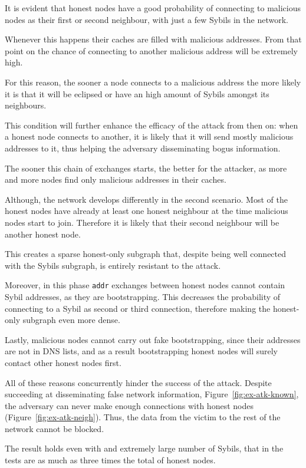 It is evident that honest nodes have a good probability of connecting to malicious nodes as their first or second neighbour, with just a few Sybils in the network.

Whenever this happens their caches are filled with malicious addresses. From that point on the chance of connecting to another malicious address will be extremely high.

For this reason, the sooner a node connects to a malicious address the more likely it is that it will be eclipsed or have an high amount of Sybils amongst its neighbours.

This condition will further enhance the efficacy of the attack from then on: when a honest node connects to another, it is likely that it will send mostly malicious addresses to it, thus helping the adversary disseminating bogus information.

The sooner this chain of exchanges starts, the better for the attacker, as more and more nodes find only malicious addresses in their caches.

Although, the network develops differently in the second scenario. Most of the honest nodes have already at least one honest neighbour at the time malicious nodes start to join. Therefore it is likely that their second neighbour will be another honest node.

This creates a sparse honest-only subgraph that, despite being well connected with the Sybils subgraph, is entirely resistant to the attack.

Moreover, in this phase \texttt{addr} exchanges between honest nodes cannot contain Sybil addresses, as they are bootstrapping. This decreases the probability of connecting to a Sybil as second or third connection, therefore making the honest-only subgraph even more dense.

Lastly, malicious nodes cannot carry out fake bootstrapping, since their addresses are not in DNS lists, and as a result bootstrapping honest nodes will surely contact other honest nodes first.

All of these reasons concurrently hinder the success of the attack. Despite succeeding at disseminating false network information, Figure~\ref{fig:ex-atk-known}, the adversary can never make enough connections with honest nodes (Figure~\ref{fig:ex-atk-neigh}).
Thus, the data from the victim to the rest of the network cannot be blocked.

The result holds even with and extremely large number of Sybils, that in the tests are as much as three times the total of honest nodes.

